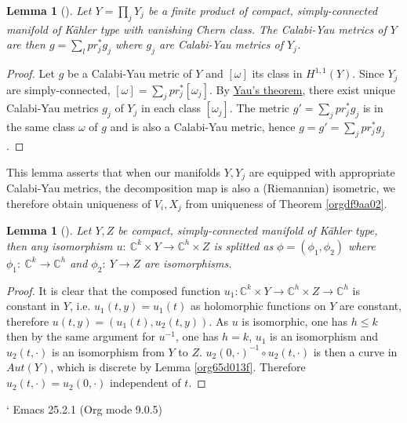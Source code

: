 \documentclass[11pt]{article}
\newtheorem{lemma}[theorem]{Lemma}
\begin{document}
\begin{lemma}[]
Let \(Y = \prod_j Y_j\) be a finite product of compact, simply-connected manifold of Kähler type with vanishing Chern
class. The Calabi-Yau metrics of \(Y\) are then \(g = \sum_l pr_j^*g_j\) where \(g_j\) are Calabi-Yau metrics
of \(Y_j\).
\end{lemma}
\begin{proof}
Let \(g\) be a Calabi-Yau metric of \(Y\) and \([\omega]\) its class in \(H^{1,1}(Y)\). Since \(Y_j\) are
simply-connected, \([\omega] = \sum_j pr_j^* [\omega_j]\). By \href{calabi-yau.org}{Yau's theorem}, there exist unique Calabi-Yau
metrics \(g_j\) of \(Y_j\) in each class \([\omega_j]\). The metric \(g' = \sum_j pr_j^* g_j\) is in the same
class \(\omega\) of \(g\) and is also a Calabi-Yau metric, hence \(g= g' = \sum_j pr_j^*g_j\).
\end{proof}

This lemma asserts that when our manifolds \(Y, Y_j\) are equipped with appropriate Calabi-Yau metrics,
the decomposition map is also a (Riemannian) isometric, we therefore obtain uniqueness of \(V_i, X_j\)
from uniqueness of Theorem \ref{orgdf9aa02}.

\begin{lemma}[]
Let \(Y,Z\) be compact, simply-connected manifold of Kähler type, then any isomorphism \(u:\
\mathbb{C}^k\times Y\longrightarrow \mathbb{C}^h\times Z\) is splitted as \(\phi = (\phi_1,\phi_2)\)
where \(\phi_1:\ \mathbb{C}^k\longrightarrow \mathbb{C}^h\) and \(\phi_2:\ Y\longrightarrow Z\) are
isomorphisms.
\end{lemma}
\begin{proof}
It is clear that the composed function \(u_1: \mathbb{C}^k\times Y \longrightarrow \mathbb{C}^h \times Z
\longrightarrow \mathbb{C}^h\) is constant in \(Y\), i.e. \(u_1(t,y) = u_1(t)\) as holomorphic
functions on \(Y\) are constant, therefore  \(u(t,y) = (u_1(t), u_2(t,y))\). As \(u\) is isomorphic, one
has \(h\leq k\) then by the same argument for \(u^{-1}\), one has \(h=k\), \(u_1\) is an isomorphism and
\(u_2(t,\cdot)\) is an isomorphism from \(Y\) to \(Z\). \(u_2(0,\cdot)^{-1}\circ u_2(t,\cdot)\) is then a curve in
\(Aut(Y)\), which is discrete by Lemma \ref{org65d013f}. Therefore \(u_2(t,\cdot)= u_2(0,\cdot)\) independent of \(t\).
\end{proof}

`
Emacs 25.2.1 (Org mode 9.0.5)
\end{document}
